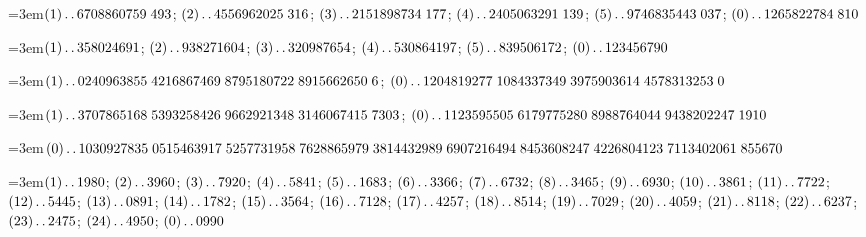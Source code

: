\par\noindent\hangindent=3em\enspace $(1)\mathinner{.\,.}6708860759\;\allowbreak 493$; $(2)\mathinner{.\,.}4556962025\;\allowbreak 316$; $(3)\mathinner{.\,.}2151898734\;\allowbreak 177$; $(4)\mathinner{.\,.}2405063291\;\allowbreak 139$; $(5)\mathinner{.\,.}9746835443\;\allowbreak 037$; $(0)\mathinner{.\,.}1265822784\;\allowbreak 810$\par\smallskip

\par\noindent\hangindent=3em\enspace $(1)\mathinner{.\,.}358024691$; $(2)\mathinner{.\,.}938271604$; $(3)\mathinner{.\,.}320987654$; $(4)\mathinner{.\,.}530864197$; $(5)\mathinner{.\,.}839506172$; $(0)\mathinner{.\,.}123456790$\par\smallskip

\par\noindent\hangindent=3em\enspace $(1)\mathinner{.\,.}0240963855\;\allowbreak 4216867469\;\allowbreak 8795180722\;\allowbreak 8915662650\;\allowbreak 6$; $(0)\mathinner{.\,.}1204819277\;\allowbreak 1084337349\;\allowbreak 3975903614\;\allowbreak 4578313253\;\allowbreak 0$\par\smallskip

\par\noindent\hangindent=3em\enspace $(1)\mathinner{.\,.}3707865168\;\allowbreak 5393258426\;\allowbreak 9662921348\;\allowbreak 3146067415\;\allowbreak 7303$; $(0)\mathinner{.\,.}1123595505\;\allowbreak 6179775280\;\allowbreak 8988764044\;\allowbreak 9438202247\;\allowbreak 1910$\par\smallskip

\par\noindent\hangindent=3em\enspace $(0)\mathinner{.\,.}1030927835\;\allowbreak 0515463917\;\allowbreak 5257731958\;\allowbreak 7628865979\;\allowbreak 3814432989\;\allowbreak 6907216494\;\allowbreak 8453608247\;\allowbreak 4226804123\;\allowbreak 7113402061\;\allowbreak 855670$\par\smallskip

\par\noindent\hangindent=3em\enspace $(1)\mathinner{.\,.}1980$; $(2)\mathinner{.\,.}3960$; $(3)\mathinner{.\,.}7920$; $(4)\mathinner{.\,.}5841$; $(5)\mathinner{.\,.}1683$; $(6)\mathinner{.\,.}3366$; $(7)\mathinner{.\,.}6732$; $(8)\mathinner{.\,.}3465$; $(9)\mathinner{.\,.}6930$; $(10)\mathinner{.\,.}3861$; $(11)\mathinner{.\,.}7722$; $(12)\mathinner{.\,.}5445$; $(13)\mathinner{.\,.}0891$; $(14)\mathinner{.\,.}1782$; $(15)\mathinner{.\,.}3564$; $(16)\mathinner{.\,.}7128$; $(17)\mathinner{.\,.}4257$; $(18)\mathinner{.\,.}8514$; $(19)\mathinner{.\,.}7029$; $(20)\mathinner{.\,.}4059$; $(21)\mathinner{.\,.}8118$; $(22)\mathinner{.\,.}6237$; $(23)\mathinner{.\,.}2475$; $(24)\mathinner{.\,.}4950$; $(0)\mathinner{.\,.}0990$\par\smallskip

